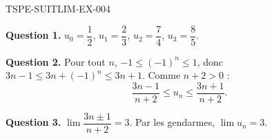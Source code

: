 \begin{corrige}{TSPE-SUITLIM-EX-004}

\textbf{Question 1.} $u_0 = \dfrac{1}{2}$, $u_1 = \dfrac{2}{3}$, $u_2 = \dfrac{7}{4}$, $u_3 = \dfrac{8}{5}$.


\textbf{Question 2.} Pour tout $n$, $-1 \leq (-1)^n \leq 1$, donc $3n - 1 \leq 3n + (-1)^n \leq 3n + 1$. Comme $n + 2 > 0$ :
\[
\frac{3n-1}{n+2} \leq u_n \leq \frac{3n+1}{n+2}.
\]

\textbf{Question 3.} $\lim \dfrac{3n \pm 1}{n+2} = 3$. Par les gendarmes, $\boxed{\lim u_n = 3}$.

\end{corrige}
